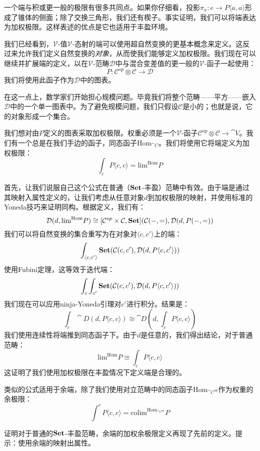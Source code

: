 \documentclass[DaoFP]{subfiles}
\begin{document}
 一个端与积或更一般的极限有很多共同点。如果你仔细看，投影$\pi_x \colon e \to P \langle a, a \rangle$形成了锥体的侧面；除了交换三角形，我们还有楔子。事实证明，我们可以将端表达为加权极限。这样表述的优点是它也适用于丰盈环境。

 我们已经看到，$\mathcal V$-值$\mathcal V$-态射的端可以使用超自然变换的更基本概念来定义。这反过来允许我们定义自然变换的\emph{对象}，从而使我们能够定义加权极限。我们现在可以继续并扩展端的定义，以在$\mathcal V$-范畴$\mathcal D$中与混合变差值的更一般的$\mathcal V$-函子一起使用：
 \[ P \colon \mathcal C^{op} \otimes \mathcal C \to \mathcal D \]
 我们将使用此函子作为$\mathcal D$中的图表。

 在这一点上，数学家们开始担心规模问题。毕竟我们将整个范畴——平方——嵌入$\mathcal D$中的一个单一图表中。为了避免规模问题，我们只假设$\mathcal C$是小的；也就是说，它的对象形成一个集合。

 我们想对由$P$定义的图表采取加权极限。权重必须是一个$\mathcal V$-函子$\mathcal C^{op} \otimes \mathcal C \to \cat V$。我们有一个总是在我们手边的函子，同态函子$\text{Hom}_{\cat C}$。我们将使用它将端定义为加权极限：
 \[  \int_c P\langle c, c\rangle = \text{lim}^{\text{Hom}} P\]

 首先，让我们说服自己这个公式在普通（$\mathbf{Set}$-丰盈）范畴中有效。由于端是通过其映射入属性定义的，让我们考虑从任意对象$d$到加权极限的映射，并使用标准的Yoneda技巧来证明同构。根据定义，我们有：
 \[ \mathcal{D}(d, \text{lim}^{\text{Hom}} P) \cong [\mathcal{C}^{op} \times \mathcal{C}, \mathbf{Set}](\mathcal{C}(-, =), \mathcal{D} (d, P(-, =))\]
 我们可以将自然变换的集合重写为在对象对$\langle c, c' \rangle$上的端：
 \[ \int_{\langle c, c' \rangle} \mathbf{Set}(\mathcal{C}(c, c'), \mathcal{D} (d, P\langle c, c' \rangle)) \]
 使用Fubini定理，这等效于迭代端：
 \[\int_c \int_{c'} \mathbf{Set}(\mathcal{C}(c, c'), \mathcal{D}(d, P\langle c, c' \rangle))\]
 我们现在可以应用ninja-Yoneda引理对$c'$进行积分。结果是：
 \[ \int_c \cat D(d, P\langle c, c \rangle) \cong \cat D(d, \int_c P \langle c, c \rangle) \]
 我们使用连续性将端推到同态函子下。由于$d$是任意的，我们得出结论，对于普通范畴：
 \[ \text{lim}^{\text{Hom}} P \cong  \int_c P\langle c, c\rangle \]
 这证明了我们使用加权极限在丰盈情况下定义端是合理的。

 类似的公式适用于余端，除了我们使用对立范畴中的同态函子$\text{Hom}_{\cat C^{op}}$作为权重的余极限：
 \[  \int^c P\langle c, c\rangle = \text{colim}^{\text{Hom}_{\cat C^{op}}} P\]

 \begin{exercise}
  证明对于普通的$\mathbf{Set}$-丰盈范畴，余端的加权余极限定义再现了先前的定义。提示：使用余端的映射出属性。
 \end{exercise}
\end{document}
